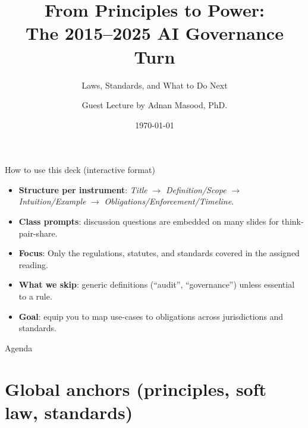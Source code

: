 \documentclass[aspectratio=169]{beamer}
\title{From Principles to Power: \\ \Large The 2015--2025 AI Governance Turn}
\subtitle{Laws, Standards, and What to Do Next}
\author{Guest Lecture by Adnan Masood, PhD.}
\institute{Graduate Seminar on AI Governance}
\date{\today}
\begin{document}
\begin{frame}
  \titlepage
\end{frame}

\begin{frame}{How to use this deck (interactive format)}
\begin{itemize}
  \item \textbf{Structure per instrument}: \textit{Title} $\rightarrow$ \textit{Definition/Scope} $\rightarrow$ \textit{Intuition/Example} $\rightarrow$ \textit{Obligations/Enforcement/Timeline}.
  \item \textbf{Class prompts}: discussion questions are embedded on many slides for think-pair-share.
  \item \textbf{Focus}: Only the regulations, statutes, and standards covered in the assigned reading.
  \item \textbf{What we skip}: generic definitions (``audit'', ``governance'') unless essential to a rule.
  \item \textbf{Goal}: equip you to map use-cases to obligations across jurisdictions and standards.
\end{itemize}
\end{frame}

\begin{frame}{Agenda}
\tableofcontents
\end{frame}

\section{Global anchors (principles, soft law, standards)}
\end{document}
